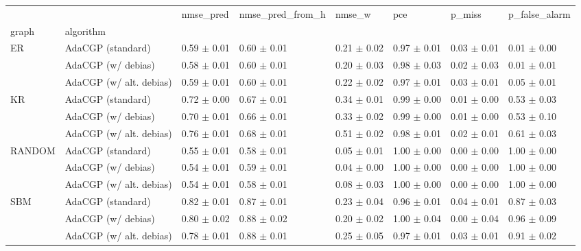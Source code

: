 \begin{tabular}{llllllll}
\toprule
 &  & nmse_pred & nmse_pred_from_h & nmse_w & pce & p_miss & p_false_alarm \\
graph & algorithm &  &  &  &  &  &  \\
\midrule
\multirow[t]{3}{*}{ER} & AdaCGP (standard) & 0.59 $\pm$ 0.01 & 0.60 $\pm$ 0.01 & 0.21 $\pm$ 0.02 & 0.97 $\pm$ 0.01 & 0.03 $\pm$ 0.01 & 0.01 $\pm$ 0.00 \\
 & AdaCGP (w/ debias) & 0.58 $\pm$ 0.01 & 0.60 $\pm$ 0.01 & 0.20 $\pm$ 0.03 & 0.98 $\pm$ 0.03 & 0.02 $\pm$ 0.03 & 0.01 $\pm$ 0.01 \\
 & AdaCGP (w/ alt. debias) & 0.59 $\pm$ 0.01 & 0.60 $\pm$ 0.01 & 0.22 $\pm$ 0.02 & 0.97 $\pm$ 0.01 & 0.03 $\pm$ 0.01 & 0.05 $\pm$ 0.01 \\
\cline{1-8}
\multirow[t]{3}{*}{KR} & AdaCGP (standard) & 0.72 $\pm$ 0.00 & 0.67 $\pm$ 0.01 & 0.34 $\pm$ 0.01 & 0.99 $\pm$ 0.00 & 0.01 $\pm$ 0.00 & 0.53 $\pm$ 0.03 \\
 & AdaCGP (w/ debias) & 0.70 $\pm$ 0.01 & 0.66 $\pm$ 0.01 & 0.33 $\pm$ 0.02 & 0.99 $\pm$ 0.00 & 0.01 $\pm$ 0.00 & 0.53 $\pm$ 0.10 \\
 & AdaCGP (w/ alt. debias) & 0.76 $\pm$ 0.01 & 0.68 $\pm$ 0.01 & 0.51 $\pm$ 0.02 & 0.98 $\pm$ 0.01 & 0.02 $\pm$ 0.01 & 0.61 $\pm$ 0.03 \\
\cline{1-8}
\multirow[t]{3}{*}{RANDOM} & AdaCGP (standard) & 0.55 $\pm$ 0.01 & 0.58 $\pm$ 0.01 & 0.05 $\pm$ 0.01 & 1.00 $\pm$ 0.00 & 0.00 $\pm$ 0.00 & 1.00 $\pm$ 0.00 \\
 & AdaCGP (w/ debias) & 0.54 $\pm$ 0.01 & 0.59 $\pm$ 0.01 & 0.04 $\pm$ 0.00 & 1.00 $\pm$ 0.00 & 0.00 $\pm$ 0.00 & 1.00 $\pm$ 0.00 \\
 & AdaCGP (w/ alt. debias) & 0.54 $\pm$ 0.01 & 0.58 $\pm$ 0.01 & 0.08 $\pm$ 0.03 & 1.00 $\pm$ 0.00 & 0.00 $\pm$ 0.00 & 1.00 $\pm$ 0.00 \\
\cline{1-8}
\multirow[t]{3}{*}{SBM} & AdaCGP (standard) & 0.82 $\pm$ 0.01 & 0.87 $\pm$ 0.01 & 0.23 $\pm$ 0.04 & 0.96 $\pm$ 0.01 & 0.04 $\pm$ 0.01 & 0.87 $\pm$ 0.03 \\
 & AdaCGP (w/ debias) & 0.80 $\pm$ 0.02 & 0.88 $\pm$ 0.02 & 0.20 $\pm$ 0.02 & 1.00 $\pm$ 0.04 & 0.00 $\pm$ 0.04 & 0.96 $\pm$ 0.09 \\
 & AdaCGP (w/ alt. debias) & 0.78 $\pm$ 0.01 & 0.88 $\pm$ 0.01 & 0.25 $\pm$ 0.05 & 0.97 $\pm$ 0.01 & 0.03 $\pm$ 0.01 & 0.91 $\pm$ 0.02 \\
\cline{1-8}
\bottomrule
\end{tabular}
